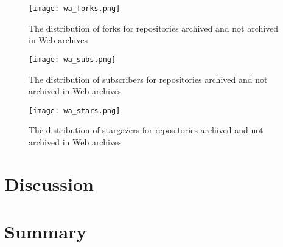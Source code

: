 \begin{figure}
    \centering
    \texttt{[image: wa\_forks.png]}
    \caption{The distribution of forks for repositories archived and not archived in Web archives}
    \label{fig:wa_forks}
\end{figure}

\begin{figure}
    \centering
    \texttt{[image: wa\_subs.png]}
    \caption{The distribution of subscribers for repositories archived and not archived in Web archives}
    \label{fig:wa_subs}
\end{figure}

\begin{figure}
    \centering
    \texttt{[image: wa\_stars.png]}
    \caption{The distribution of stargazers for repositories archived and not archived in Web archives}
    \label{fig:wa_stars}
\end{figure}

\section{Discussion}

\section{Summary}
